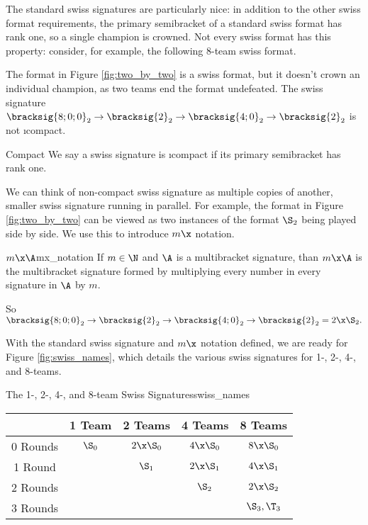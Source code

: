 {

    The standard swiss signatures are particularly nice: in addition to the other swiss format requirements, the primary semibracket of a standard swiss format has rank one, so a single champion is crowned. Not every swiss format has this property: consider, for example, the following 8-team swiss format.


    The format in Figure \ref{fig:two_by_two} is a swiss format, but it doesn't crown an individual champion, as two teams end the format undefeated. The swiss signature $\bracksig{8;0;0}_2 \to \bracksig{2}_2 \to \bracksig{4;0}_2 \to \bracksig{2}_2$ is not \i{compact}.

   \begin{definition}{Compact}{}
        We say a swiss signature is \i{compact} if its primary semibracket has rank one.
   \end{definition}

   We can think of non-compact swiss signature as multiple copies of another, smaller swiss signature running in parallel. %
   For example, the format in Figure \ref{fig:two_by_two} can be viewed as two instances of the format $\S_2$ being played side by side. We use this to introduce $m\x$ notation. 

   \begin{definition}{$m\x\A$}{mx_notation}
        If $m \in \N$ and $\A$ is a multibracket signature, than $m\x\A$ is the multibracket signature formed by multiplying every number in every signature in $\A$ by $m$.
    \end{definition}

    So $\bracksig{8;0;0}_2 \to \bracksig{2}_2 \to \bracksig{4;0}_2 \to \bracksig{2}_2 = 2\x\S_2.$

    With the standard swiss signature and $m\x$ notation defined, we are ready for Figure \ref{fig:swiss_names}, which details the various swiss signatures for 1-, 2-, 4-, and 8-teams.

    \begin{figg}{The 1-, 2-, 4-, and 8-team Swiss Signatures}{swiss_names}
        \begin{center}
            \begin{tabular}{ c | c | c | c | c}
                & 1 Team & 2 Teams & 4 Teams & 8 Teams\\
                \hline
                0 Rounds & $\S_0$ & $2\x\S_0$ & $4\x\S_0$ & $8\x\S_0$\\
                \hline
                1 Round & & $\S_1$ & $2\x\S_1$ & $4\x\S_1$\\
                \hline
                2 Rounds & & & $\S_2$ & $2\x\S_2$\\
                \hline
                \multirow{1}{*}{3 Rounds} & & & &  $\S_3, \T_3$ \\
            \end{tabular}
        \end{center}
        \end{figg}

}

